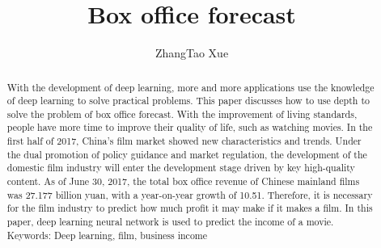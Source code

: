 \documentclass{amsart}
\begin{document}
%
%
\title[A Short Running Title]{ Box office forecast}%

\author{ZhangTao Xue}
\address[A.~1]{School of Computer Science,\\ 
Xi'an Shiyou University, Shaanxi 710065, China}%


%
%
\date{\gitAuthorDate}%

\begin{abstract}
    With the development of deep learning, more and more applications use the knowledge of deep learning to solve practical problems. This paper discusses how to use depth to solve the problem of box office forecast. With the improvement of living standards, people have more time to improve their quality of life, such as watching movies. In the first half of 2017, China's film market showed new characteristics and trends. Under the dual promotion of policy guidance and market regulation, the development of the domestic film industry will enter the development stage driven by key high-quality content. As of June 30, 2017, the total box office revenue of Chinese mainland films was 27.177 billion yuan, with a year-on-year growth of 10.51. Therefore, it is necessary for the film industry to predict how much profit it may make if it makes a film. In this paper, deep learning neural network is used to predict the income of a movie.\\
    Keywords: Deep learning, film, business income
\end{abstract}

\maketitle
\tableofcontents

\newpage



\newpage




\listoftodos
\end{document}
